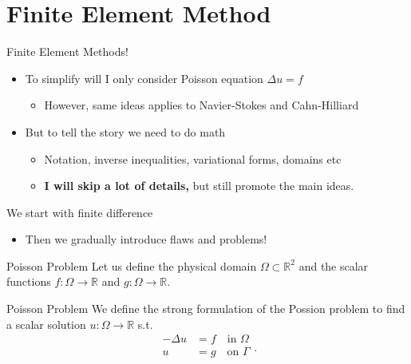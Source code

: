

\newpage
\section{Finite Element Method}%
\label{sec:finite_element_method}


\begin{frame}{}
        \begin{block}{Finite Element Methods!}
            \begin{itemize}
                \item To simplify will I only consider Poisson equation $ \Delta u =f $
                    \begin{itemize}
                        \item However, same ideas applies to Navier-Stokes and Cahn-Hilliard
                    \end{itemize}
                \item But to tell the story we need to do math
                    \begin{itemize}
                        \item Notation, inverse inequalities, variational forms, domains etc
                        \item \textbf{I will skip a lot of details,} but still promote the main ideas.
                    \end{itemize}
            \end{itemize}
        \end{block}
\end{frame}

\begin{frame}{}
        \begin{block}{We start with finite difference}
            \begin{itemize}
                \item Then we gradually introduce flaws and problems!
            \end{itemize}
        \end{block}
\end{frame}

\begin{frame}{Poisson Problem}
    Let us define the physical domain $\Omega  \subset \mathbb{R} ^{2}$ and the scalar functions $f: \Omega  \to \mathbb{R}$ and $g: \Omega  \to \mathbb{R} $.
        \begin{block}{Poisson Problem}
  We define the strong formulation of the Possion problem to find a scalar solution
 $u:\Omega  \to \mathbb{R} $ s.t. \[
\begin{split}
    -\Delta u &= f \quad  \text{in }\Omega  \\
     u &= g  \quad \text{on } \Gamma      \\
\end{split} .
\]
        \end{block}
\end{frame}

